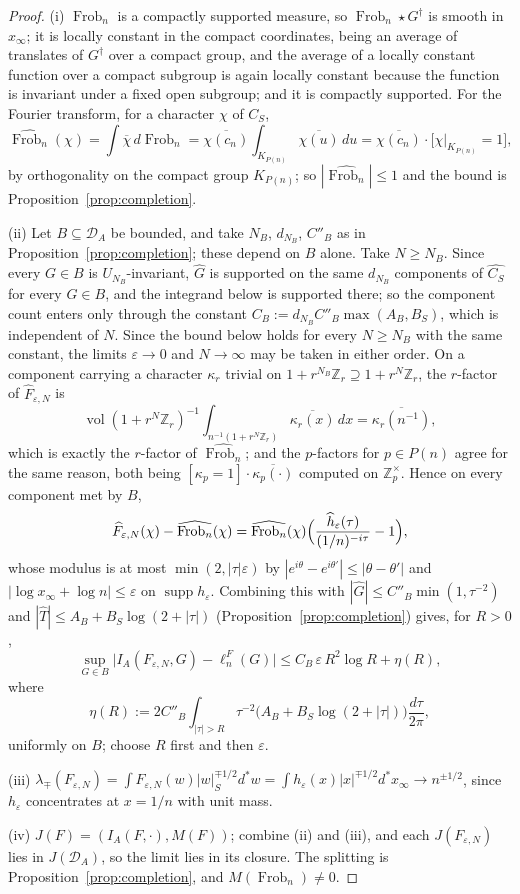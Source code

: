 \documentclass[11pt]{amsart}
\theoremstyle{definition}
\theoremstyle{remark}
\newcommand{\Z}{\mathbb Z}
\newcommand{\Frob}{\operatorname{Frob}}
\newcommand{\supp}{\operatorname{supp}}
\newcommand{\vol}{\operatorname{vol}}
\newcommand{\DA}{\mathcal D_A}
\begin{document}
\begin{proof}
(i) $\Frob_n$ is a compactly supported measure, so $\Frob_n\star G^\dagger$ is
smooth in $x_\infty$; it is locally constant in the compact coordinates,
being an average of translates of $G^\dagger$ over a compact group, and the
average of a locally constant function over a compact subgroup is again locally
constant because the function is invariant under a fixed open subgroup; and it
is compactly supported. For the Fourier transform, for a character $\chi$ of
$C_S$,
\[
  \widehat{\Frob_n}(\chi)=\int\overline\chi\,d\Frob_n
   =\overline{\chi(c_n)}\int_{K_{P(n)}}\overline{\chi(u)}\,du
   =\overline{\chi(c_n)}\cdot\bigl[\chi|_{K_{P(n)}}=1\bigr],
\]
by orthogonality on the compact group $K_{P(n)}$; so $|\widehat{\Frob_n}|\le1$
and the bound is Proposition~\ref{prop:completion}.

(ii) Let $B\subseteq\DA$ be bounded, and take $N_B$, $d_{N_B}$, $C''_B$ as in
Proposition~\ref{prop:completion}; these depend on $B$ alone. Take $N\ge N_B$.
Since every $G\in B$ is $U_{N_B}$-invariant, $\widehat G$ is supported on the
same $d_{N_B}$ components of $\widehat{C_S}$ for every $G\in B$, and the
integrand below is supported there; so the component count enters only through
the constant $C_B:=d_{N_B}C''_B\max(A_B,B_S)$, which is independent of $N$.
Since the bound below holds for every $N\ge N_B$ with the same constant, the
limits $\varepsilon\to0$ and $N\to\infty$ may be taken in either order. On a component carrying a
character $\kappa_r$ trivial on $1+r^{N_B}\Z_r\supseteq1+r^N\Z_r$, the
$r$-factor of $\widehat F_{\varepsilon,N}$ is
\[
  \vol(1+r^N\Z_r)^{-1}\int_{n^{-1}(1+r^N\Z_r)}\overline{\kappa_r(x)}\,dx
   =\overline{\kappa_r(n^{-1})},
\]
which is exactly the $r$-factor of $\widehat{\Frob_n}$; and the $p$-factors for
$p\in P(n)$ agree for the same reason, both being
$[\kappa_p=1]\cdot\overline{\kappa_p(\cdot)}$ computed on $\Z_p^\times$. Hence
on every component met by $B$,
\[
  \widehat F_{\varepsilon,N}(\chi)-\widehat{\Frob_n}(\chi)
   =\widehat{\Frob_n}(\chi)\Bigl(\frac{\widehat h_\varepsilon(\tau)}
     {(1/n)^{-i\tau}}-1\Bigr),
\]
whose modulus is at most $\min(2,|\tau|\varepsilon)$ by
$|e^{i\theta}-e^{i\theta'}|\le|\theta-\theta'|$ and
$|\log x_\infty+\log n|\le\varepsilon$ on $\supp h_\varepsilon$. Combining this
with $|\widehat G|\le C''_B\min(1,\tau^{-2})$ and
$|\widehat T|\le A_B+B_S\log(2+|\tau|)$ (Proposition~\ref{prop:completion}) gives, for $R>0$,
\[
  \sup_{G\in B}\bigl|I_A(F_{\varepsilon,N},G)-\ell_n^F(G)\bigr|
   \le C_B\,\varepsilon\,R^2\log R+\eta(R),
\]
where
\[
  \eta(R):=2C''_B\int_{|\tau|>R}\tau^{-2}
    \bigl(A_B+B_S\log(2+|\tau|)\bigr)\frac{d\tau}{2\pi},
\]
uniformly on $B$; choose $R$ first and then $\varepsilon$.

(iii) $\lambda_\mp(F_{\varepsilon,N})=\int F_{\varepsilon,N}(w)|w|_S^{\mp1/2}
d^*w=\int h_\varepsilon(x)|x|^{\mp1/2}d^*x_\infty\to n^{\pm1/2}$, since
$h_\varepsilon$ concentrates at $x=1/n$ with unit mass.

(iv) $J(F)=(I_A(F,\cdot),M(F))$; combine (ii) and (iii), and each
$J(F_{\varepsilon,N})$ lies in $J(\DA)$, so the limit lies in its closure. The
splitting is Proposition~\ref{prop:completion}, and $M(\Frob_n)\ne0$.
\end{proof}
\end{document}
